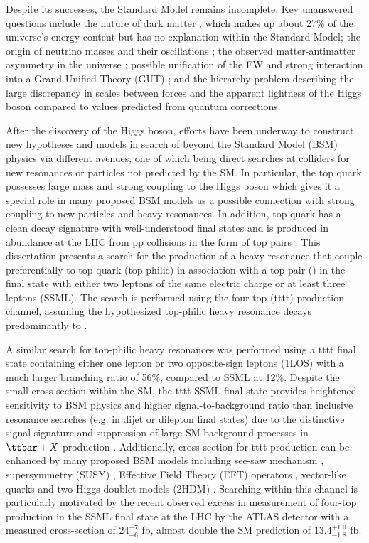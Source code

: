 \documentclass[../thesis.tex]{subfiles}
\begin{document}
Despite its successes, the Standard Model remains incomplete. Key unanswered questions include the nature of dark matter \tocite, which makes up about 27\% of the universe’s energy content but has no explanation within the Standard Model; the origin of neutrino masses and their oscillations \tocite; the observed matter-antimatter asymmetry in the universe \tocite; possible unification of the \acs{EW} and strong interaction into a Grand Unified Theory (\acs{GUT}) \tocite; and the hierarchy problem \tocite describing the large discrepancy in scales between forces and the apparent lightness of the Higgs boson compared to values predicted from quantum corrections. 

After the discovery of the Higgs boson, efforts have been underway to construct new hypotheses and models in search of beyond the Standard Model (\acs{BSM}) physics via different avenues, one of which being direct searches at colliders for new resonances or particles not predicted by the \acs{SM}. In particular, the top quark possesses large mass and strong coupling to the Higgs boson \tocite which gives it a special role in many proposed \acs{BSM} models as a possible connection with strong coupling to new particles and heavy resonances. In addition, top quark has a clean decay signature with well-understood final states and is produced in abundance at the \acs{LHC} from \acs{pp} collisions in the form of top pairs \ttbar \tocite. This dissertation presents a search for the production of a heavy resonance that couple preferentially to top quark (top-philic) in association with a top pair (\ttbar) in the final state with either two leptons of the same electric charge or at least three leptons (\acs{SSML}). The search is performed using the four-top (\acs{tttt}) production channel, assuming the hypothesized top-philic heavy resonance decays predominantly to \ttbar.

A similar search for top-philic heavy resonances was performed using a \acs{tttt} final state containing either one lepton or two opposite-sign leptons (\acs{1LOS}) \citep{theory:ttZp_1los} with a much larger branching ratio of 56\%, compared to \acs{SSML} at 12\%. Despite the small cross-section within the \acs{SM}, the \acs{tttt} \acs{SSML} final state provides heightened sensitivity to \acs{BSM} physics and higher signal-to-background ratio than inclusive resonance searches (e.g. in dijet or dilepton final states) due to the distinctive signal signature and suppression of large \acs{SM} background processes in $\ttbar+X$ production \tocite. Additionally, cross-section for \acs{tttt} production can be enhanced by many proposed \acs{BSM} models including see-saw mechanism \tocite, supersymmetry (SUSY) \tocite, Effective Field Theory (EFT) operators \tocite, vector-like quarks \tocite and two-Higgs-doublet models (2HDM) \tocite. Searching within this channel is particularly motivated by the recent observed excess in measurement of four-top production in the \acs{SSML} final state at the \acs{LHC} by the \acs{ATLAS} detector with a measured cross-section of $24^{+7}_{-6}$ fb, almost double the \acs{SM} prediction of $13.4^{+1.0}_{-1.8}$ fb.
\end{document}

